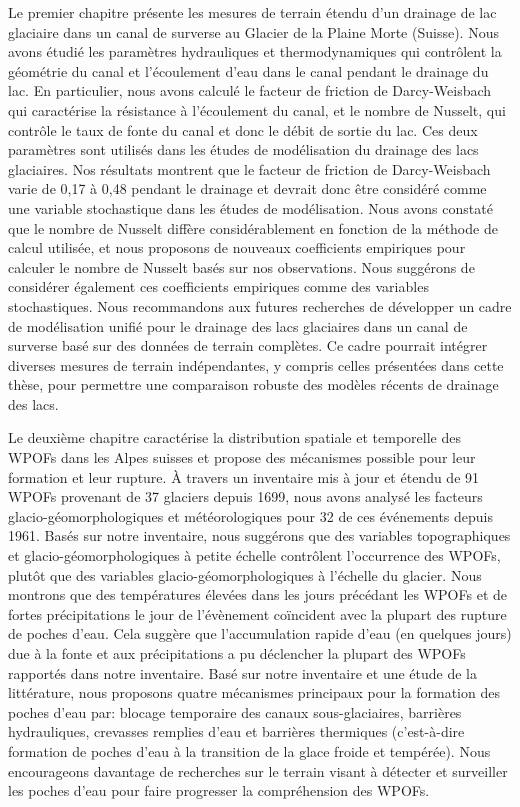 Le premier chapitre présente les mesures de terrain étendu d'un drainage de lac glaciaire dans un canal de surverse au Glacier de la Plaine Morte (Suisse). Nous avons étudié les paramètres hydrauliques et thermodynamiques qui contrôlent la géométrie du canal et l'écoulement d'eau dans le canal pendant le drainage du lac. En particulier, nous avons calculé le facteur de friction de Darcy-Weisbach qui caractérise la résistance à l'écoulement du canal, et le nombre de Nusselt, qui contrôle le taux de fonte du canal et donc le débit de sortie du lac. Ces deux paramètres sont utilisés dans les études de modélisation du drainage des lacs glaciaires. Nos résultats montrent que le facteur de friction de Darcy-Weisbach varie de 0,17 à 0,48 pendant le drainage et devrait donc être considéré comme une variable stochastique dans les études de modélisation. Nous avons constaté que le nombre de Nusselt diffère considérablement en fonction de la méthode de calcul utilisée, et nous proposons de nouveaux coefficients empiriques pour calculer le nombre de Nusselt basés sur nos observations. Nous suggérons de considérer également ces coefficients empiriques comme des variables stochastiques. Nous recommandons aux futures recherches de développer un cadre de modélisation unifié pour le drainage des lacs glaciaires dans un canal de surverse basé sur des données de terrain complètes. Ce cadre pourrait intégrer diverses mesures de terrain indépendantes, y compris celles présentées dans cette thèse, pour permettre une comparaison robuste des modèles récents de drainage des lacs.
%

Le deuxième chapitre caractérise la distribution spatiale et temporelle des WPOFs dans les Alpes suisses et propose des mécanismes possible pour leur formation et leur rupture. À travers un inventaire mis à jour et étendu de 91 WPOFs provenant de 37 glaciers depuis 1699, nous avons analysé les facteurs glacio-géomorphologiques et météorologiques pour 32 de ces événements depuis 1961. Basés sur notre inventaire, nous suggérons que des variables topographiques et glacio-géomorphologiques à petite échelle contrôlent l'occurrence des WPOFs, plutôt que des variables glacio-géomorphologiques à l'échelle du glacier. Nous montrons que des températures élevées dans les jours précédant les WPOFs et de fortes précipitations le jour de l'évènement coïncident avec la plupart des rupture de poches d'eau. Cela suggère que l'accumulation rapide d'eau (en quelques jours) due à la fonte et aux précipitations a pu déclencher la plupart des WPOFs rapportés dans notre inventaire. Basé sur notre inventaire et une étude de la littérature, nous proposons quatre mécanismes principaux pour la formation des poches d'eau par: blocage temporaire des canaux sous-glaciaires, barrières hydrauliques, crevasses remplies d'eau et barrières thermiques (c'est-à-dire formation de poches d'eau à la transition de la glace froide et tempérée). Nous encourageons davantage de recherches sur le terrain visant à détecter et surveiller les poches d'eau pour faire progresser la compréhension des WPOFs.
%

